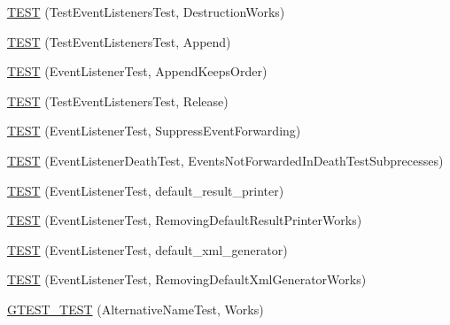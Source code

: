 \begin{DoxyCompactItemize}
\item 
\mbox{\hyperlink{_obj__test_2lib_2googletest-master_2googletest_2test_2gtest__unittest_8cc_a1d1592cafc34c09de7a810a7c4855162}{T\+E\+ST}} (Test\+Event\+Listeners\+Test, Destruction\+Works)
\item 
\mbox{\hyperlink{_obj__test_2lib_2googletest-master_2googletest_2test_2gtest__unittest_8cc_a4b3f65b804787ed25c4136df142e1f77}{T\+E\+ST}} (Test\+Event\+Listeners\+Test, Append)
\item 
\mbox{\hyperlink{_obj__test_2lib_2googletest-master_2googletest_2test_2gtest__unittest_8cc_a2a1ece611968f69f9feb86f639089511}{T\+E\+ST}} (Event\+Listener\+Test, Append\+Keeps\+Order)
\item 
\mbox{\hyperlink{_obj__test_2lib_2googletest-master_2googletest_2test_2gtest__unittest_8cc_aefe7d8b3422fb27b9c7281c0434881be}{T\+E\+ST}} (Test\+Event\+Listeners\+Test, Release)
\item 
\mbox{\hyperlink{_obj__test_2lib_2googletest-master_2googletest_2test_2gtest__unittest_8cc_abdd2f070281db35988b7f6c22f2623e7}{T\+E\+ST}} (Event\+Listener\+Test, Suppress\+Event\+Forwarding)
\item 
\mbox{\hyperlink{_obj__test_2lib_2googletest-master_2googletest_2test_2gtest__unittest_8cc_a3e3bfce9c199215053e43d9d1a248af8}{T\+E\+ST}} (Event\+Listener\+Death\+Test, Events\+Not\+Forwarded\+In\+Death\+Test\+Subprecesses)
\item 
\mbox{\hyperlink{_obj__test_2lib_2googletest-master_2googletest_2test_2gtest__unittest_8cc_a6fa482480599861df0c182c4d4229133}{T\+E\+ST}} (Event\+Listener\+Test, default\+\_\+result\+\_\+printer)
\item 
\mbox{\hyperlink{_obj__test_2lib_2googletest-master_2googletest_2test_2gtest__unittest_8cc_a32187fe0e1d4620d0ed5a7c6cc7254b8}{T\+E\+ST}} (Event\+Listener\+Test, Removing\+Default\+Result\+Printer\+Works)
\item 
\mbox{\hyperlink{_obj__test_2lib_2googletest-master_2googletest_2test_2gtest__unittest_8cc_aff2c25cbedbe72d8bb0162bc1bd0fece}{T\+E\+ST}} (Event\+Listener\+Test, default\+\_\+xml\+\_\+generator)
\item 
\mbox{\hyperlink{_obj__test_2lib_2googletest-master_2googletest_2test_2gtest__unittest_8cc_a77647d09c995f09d06e2f02b13277c44}{T\+E\+ST}} (Event\+Listener\+Test, Removing\+Default\+Xml\+Generator\+Works)
\item 
\mbox{\hyperlink{_obj__test_2lib_2googletest-master_2googletest_2test_2gtest__unittest_8cc_a54247aeadc0617105812dca8609638de}{G\+T\+E\+S\+T\+\_\+\+T\+E\+ST}} (Alternative\+Name\+Test, Works)

\end{DoxyCompactItemize}
